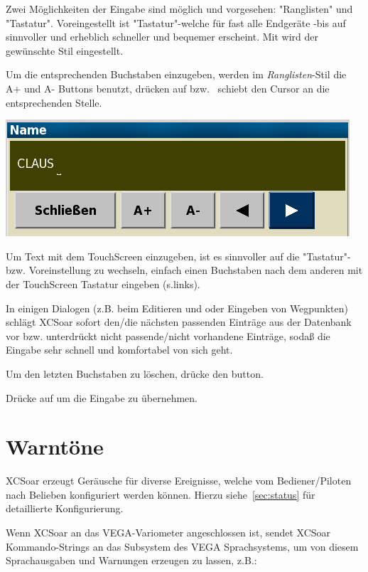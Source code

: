  Zwei Möglichkeiten der Eingabe sind möglich und vorgesehen:  "Ranglisten"  und "Tastatur".
Voreingestellt ist "Tastatur"-welche für fast alle Endgeräte -bis auf \al sinnvoller und erheblich schneller und bequemer erscheint. Mit  wird der gewünschte Stil eingestellt.

Um die entsprechenden  Buchstaben einzugeben, werden im \textit{Ranglisten}-Stil die A+ und  A- Buttons benutzt, drücken auf  \button{$<$} bzw.\   \button{$>$} schiebt den Cursor an die entsprechenden Stelle.
 
\begin{center}
\includegraphics[angle=0,width=0.65\linewidth,keepaspectratio='true']{figures/textentry.png}
\end{center}

Um Text mit dem TouchScreen einzugeben, ist es sinnvoller  auf die "Tastatur"- bzw. Voreinstellung zu wechseln, einfach einen Buchstaben nach dem anderen mit der TouchScreen Tastatur eingeben (s.links).

In einigen Dialogen (z.B. beim Editieren und oder Eingeben von Wegpunkten) schlägt \textsf{XCSoar} sofort den/die nächsten passenden Einträge aus der Datenbank vor bzw. unterdrückt nicht passende/nicht vorhandene Einträge, sodaß die Eingabe sehr schnell und komfortabel von sich geht.

Um den letzten Buchstaben zu löschen, drücke den  \button{$<-$} button.

Drücke auf   um die Eingabe zu übernehmen.

\section{Warntöne}

\textsf{XCSoar} erzeugt Geräusche für diverse Ereignisse, welche vom Bediener/Piloten  nach Belieben konfiguriert werden können.
Hierzu siehe~\ref{sec:status} für detaillierte Konfigurierung.

Wenn \textsf{XCSoar} an das VEGA-Variometer angeschlossen ist,  sendet \textsf{XCSoar} Kommando-Strings an das Subsystem des VEGA Sprachsystems, um von diesem Sprachausgaben und Warnungen erzeugen zu lassen, z.B.:

